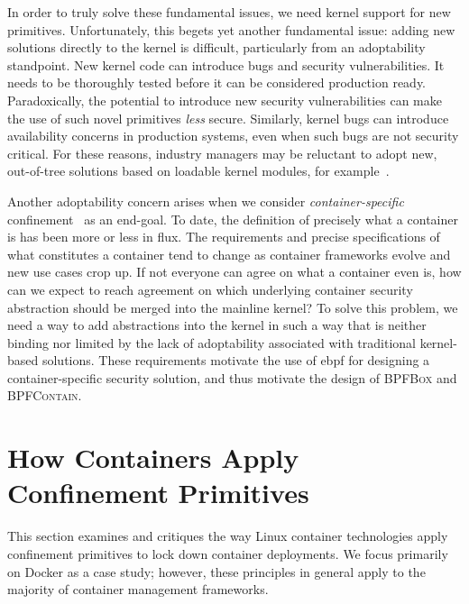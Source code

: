 \documentclass[
  fontsize=12pt,
  titlepage=firstiscover,
  paper=letter,
oneside,
  cleardoublepage=plain,
  parskip=half-,
  DIV=10,
  parindent,
  appendixprefix,
  chapterprefix,
  listof=totoc,
]{scrbook}
\newcommand{\bpfbox}{\textsc{BPFBox}}
\newcommand{\bpfcontain}{\textsc{BPFContain}}
\begin{document}
\begin{enumerate}[font=\bfseries]
    In order to truly solve these fundamental issues, we need kernel support for new
    primitives. Unfortunately, this begets yet another fundamental issue: adding new
    solutions directly to the kernel is difficult, particularly from an adoptability
    standpoint. New kernel code can introduce bugs and security vulnerabilities. It needs
    to be thoroughly tested before it can be considered production ready. Paradoxically,
    the potential to introduce new security vulnerabilities can make the use of such novel
    primitives \textit{less} secure. Similarly, kernel bugs can introduce availability
    concerns in production systems, even when such bugs are not security critical. For
    these reasons, industry managers may be reluctant to adopt new, out-of-tree solutions
    based on loadable kernel modules, for example~\cite{gregg2019_bpf}.

Another adoptability concern arises when we consider \textit{container-specific}
    confinement~\cite{sultan2019_container_security, sun2018_security_namespace} as an
    end-goal.  To date, the definition of precisely what a container is has been more or
    less in flux. The requirements and precise specifications of what constitutes
    a container tend to change as container frameworks evolve and new use cases crop up.
    If not everyone can agree on what a container even is, how can we expect to reach
    agreement on which underlying container security abstraction should be merged into the
    mainline kernel? To solve this problem, we need a way to add abstractions into the
    kernel in such a way that is neither binding nor limited by the lack of adoptability
    associated with traditional kernel-based solutions. These requirements motivate the
    use of \gls{ebpf} for designing a container-specific security solution, and thus
    motivate the design of \bpfbox{} and \bpfcontain{}.
\end{enumerate}



\section{How Containers Apply Confinement Primitives}\label{s:cp-containers}

This section examines and critiques the way Linux container technologies apply confinement
primitives to lock down container deployments. We focus primarily on Docker as a case
study; however, these principles in general apply to the majority of container management
frameworks.
\end{document}

